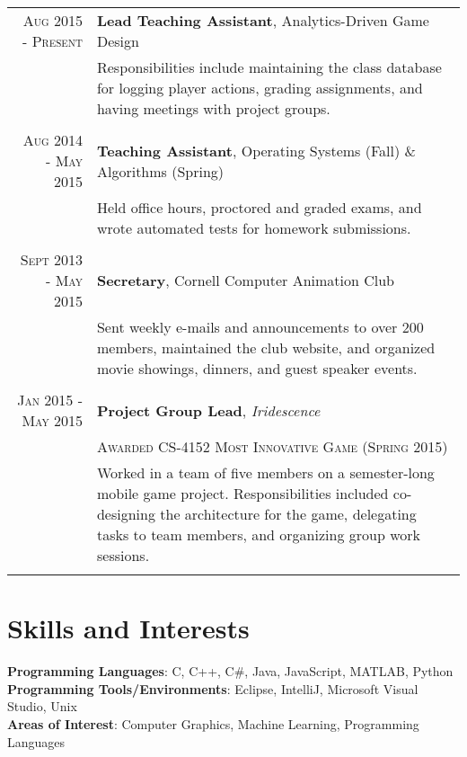 \documentclass[a4paper,10pt]{article} %
\begin{document}
\begin{tabular}{rp{11.8cm}}

\textsc{Aug 2015 - Present} & \textbf{Lead Teaching Assistant}, Analytics-Driven Game Design \\
& \small{Responsibilities include maintaining the class database for logging player actions, grading assignments, and having meetings with project groups.}\\
\multicolumn{2}{c}{} \\


\textsc{Aug 2014 - May 2015} & \textbf{Teaching Assistant}, Operating Systems (Fall) \& Algorithms (Spring) \\
& \small{Held office hours, proctored and graded exams, and wrote automated tests for homework submissions.}\\
\multicolumn{2}{c}{} \\


\textsc{Sept 2013 - May 2015} & \textbf{Secretary}, Cornell Computer Animation Club\\
& \small{Sent weekly e-mails and announcements to over 200 members, maintained the club website, and organized movie showings, dinners, and guest speaker events.}\\
\multicolumn{2}{c}{} \\


\textsc{Jan 2015 - May 2015} & \textbf{Project Group Lead}, \textit{Iridescence}\\
& \textsc{Awarded CS-4152 Most Innovative Game (Spring 2015)}\\
& \small{Worked in a team of five members on a semester-long mobile game project. Responsibilities included co-designing the architecture for the game, delegating tasks to team members, and organizing group work sessions.}\\
\multicolumn{2}{c}{} \\

\end{tabular}


\section{Skills and Interests}

\textbf{Programming Languages}: C, C++, C\#, Java, JavaScript, MATLAB, Python\\
\textbf{Programming Tools/Environments}: Eclipse, IntelliJ, Microsoft Visual Studio, Unix\\
\textbf{Areas of Interest}: Computer Graphics, Machine Learning, Programming Languages

\end{document}

